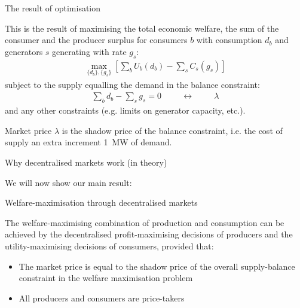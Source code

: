 \documentclass[10pt,aspectratio=169,dvipsnames]{beamer}
\def\l{\lambda}
\let\olditem\item
\renewcommand{\item}{%
\olditem\vspace{5pt}}
\begin{document}
\begin{frame}{The result of optimisation}

  This is the result of maximising the \alert{total economic welfare}, the sum of the consumer and the producer surplus for consumers $b$ with consumption $d_b$ and generators $s$ generating with rate $g_s$:
  \begin{align*}
    \max_{\{d_b\}, \{g_s\}}\left[ \sum_b U_b (d_b)  -  \sum_s C_s (g_s) \right]
  \end{align*}
  subject to the supply equalling the demand in the balance constraint:
  \begin{align*}
    \sum_b d_b -  \sum_s g_s  = 0 \hspace{1cm} \leftrightarrow \hspace{1cm} \l
  \end{align*}
  and any other constraints (e.g. limits on generator capacity, etc.).

  Market price $\l$ is the shadow price of the balance constraint,
  i.e. the cost of supply an extra increment 1~MW of demand.

\end{frame}


\begin{frame}{Why decentralised markets work (in theory)}

  We will now show our main result:

  \alert{Welfare-maximisation through decentralised markets}

        The welfare-maximising combination of production and consumption can be achieved by the decentralised profit-maximising decisions of producers and the utility-maximising decisions of consumers, provided that:
        \begin{itemize}
        \item The market price is equal to the shadow price of the overall supply-balance constraint in the welfare maximisation problem
          \item All producers and consumers are price-takers
        \end{itemize}

\end{frame}
\end{document}
